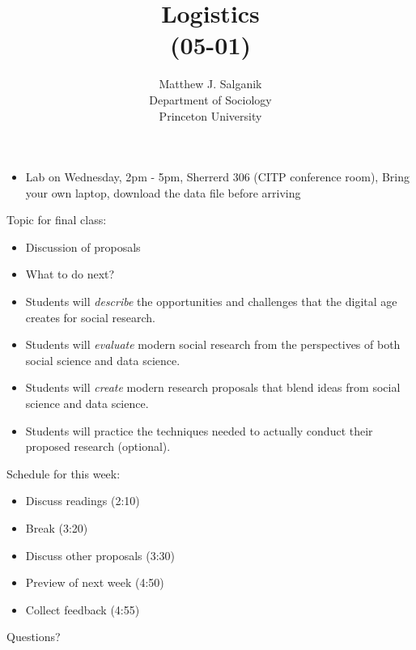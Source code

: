 \documentclass[aspectratio=169]{beamer}
\title[]{Logistics\\(05-01)}
\author[]{Matthew J. Salganik\\Department of Sociology\\Princeton University}
\date[]{Soc 596: Computational Social Science\\Fall 2016
\vfill
\begin{flushright}
\vspace{0.6in}
\texttt{[image: figures/cc.png]}
\end{flushright}
}
\def\vf{\vfill}
\begin{document}
\frame{\titlepage}
\begin{frame}

\begin{itemize}
\item Lab on Wednesday, 2pm - 5pm, Sherrerd 306 (CITP conference room), Bring your own laptop, download the data file before arriving
\end{itemize}

\end{frame}
\begin{frame}

Topic for final class:
\begin{itemize}
\item Discussion of proposals
\item What to do next?
\end{itemize}

\end{frame}
\begin{frame}

\begin{itemize}
\item Students will \emph{describe} the opportunities and challenges that the digital age creates for social research.
\item Students will \emph{evaluate} modern social research from the perspectives of both social science and data science.
\item Students will \emph{create} modern research proposals that blend ideas from social science and data science.
\item Students will practice the techniques needed to actually conduct their proposed research (optional).
\end{itemize}

\end{frame}
\begin{frame}

Schedule for this week:
\begin{itemize}
\item Discuss readings (2:10)
\item Break (3:20)
\item Discuss other proposals (3:30)
\item Preview of next week (4:50)
\item Collect feedback (4:55)
\end{itemize}

\vf
Questions?

\end{frame}
\end{document}
